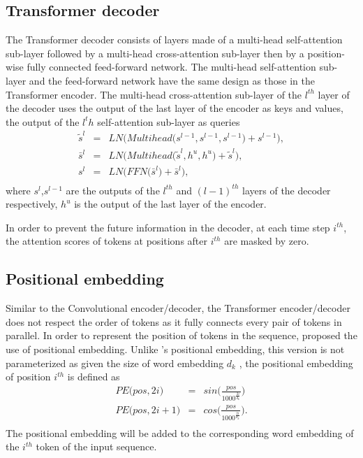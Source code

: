 \subsection{Transformer decoder}
The Transformer decoder consists of layers made of a multi-head self-attention sub-layer followed by a multi-head cross-attention sub-layer then by a position-wise fully connected feed-forward network. The multi-head self-attention sub-layer and the feed-forward network have the same design as those in the Transformer encoder. The multi-head cross-attention sub-layer of the $l^{th}$ layer of the decoder uses the output of the last layer of the encoder as keys and values, the output of the $l^th$ self-attention sub-layer as queries
\begin{equation}
\begin{array}{rcl}
\tilde{s}^l &=& LN\bigg( Multihead\big( s^{l-1},s^{l-1},s^{l-1} \big) + s^{l-1} \bigg), \\
\bar{s}^l &=& LN\bigg( Multihead\big( \tilde{s}^l, h^u, h^u \big) + \tilde{s}^l \bigg), \\
s^l &=& LN\bigg( FFN\big( \bar{s}^l \big) + \bar{s}^l \bigg), \\
\end{array}
\end{equation}
where $s^l$,$s^{l-1}$ are the outputs of the $l^{th}$ and $(l-1)^{th}$ layers of the decoder respectively, $h^u$ is the output of the last layer of the encoder.

In order to prevent the future information in the decoder, at each time step $i^{th}$, the attention scores of tokens at positions after $i^{th}$ are masked by zero.

\subsection{Positional embedding}
Similar to the Convolutional encoder/decoder, the Transformer encoder/decoder does not respect the order of tokens as it fully connects every pair of tokens in parallel. In order to represent the position of tokens in the sequence, \citet{Vaswani17attention} proposed the use of positional embedding. Unlike \citet{Ghering17convolutional}'s positional embedding, this version is not parameterized as given the size of word embedding $d_k$ , the positional embedding of position $i^{th}$ is defined as 
\begin{equation}
\begin{array}{rcl}
PE\big(pos,2i\big) &=& sin \big( \frac{pos}{1000^{\frac{2i}{d_k}}} \big)\\
PE\big(pos,2i+1\big) &=& cos \big( \frac{pos}{1000^{\frac{2i}{d_k}}} \big).\\
\end{array}
\end{equation}
The positional embedding will be added to the corresponding word embedding of the $i^{th}$ token of the input sequence.
